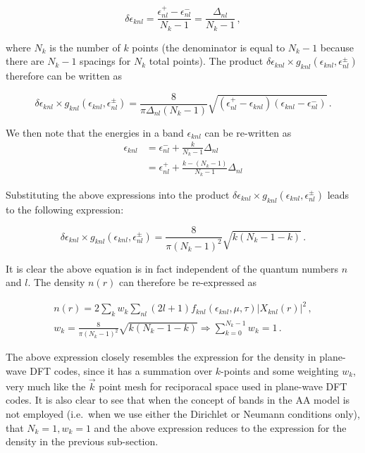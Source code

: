 \documentclass[preprint,aps]{revtex4-2}
\begin{document}
\begin{equation}
\delta\epsilon_{knl} = \frac{\epsilon^+_{nl} - \epsilon^-_{nl}}{N_k-1} = \frac{\Delta_{nl}}{N_k-1}\,,
\end{equation}

where \(N_k\) is the number of \(k\) points (the denominator is equal to
\(N_k-1\) because there are \(N_k-1\) spacings for \(N_k\) total
points). The product
\(\delta\epsilon_{knl} \times g_{knl}(\epsilon_{knl},\epsilon_{nl}^\pm)\)
therefore can be written as

\begin{equation}
\delta\epsilon_{knl} \times g_{knl}(\epsilon_{knl},\epsilon_{nl}^\pm) = \frac{8}{\pi\Delta_{nl}(N_k-1)} \sqrt{(\epsilon^+_{nl}-\epsilon_{knl})(\epsilon_{knl} - \epsilon^-_{nl})}\,.
\end{equation}

We then note that the energies in a band \(\epsilon_{knl}\) can be
re-written as \begin{align}
\epsilon_{knl} &= \epsilon_{nl}^- + \frac{k}{N_k-1}\Delta_{nl} \\
               &= \epsilon_{nl}^+ + \frac{k-(N_k-1)}{N_k-1}\Delta_{nl}
\end{align}

Substituting the above expressions into the product
\(\delta\epsilon_{knl} \times g_{knl}(\epsilon_{knl},\epsilon_{nl}^\pm)\)
leads to the following expression:

\begin{equation}
\delta\epsilon_{knl} \times g_{knl}(\epsilon_{knl},\epsilon_{nl}^\pm) = \frac{8}{\pi(N_k-1)^2}\sqrt{k(N_k-1-k)}\,.
\end{equation}

It is clear the above equation is in fact independent of the quantum
numbers \(n\) and \(l\). The density \(n(r)\) can therefore be
re-expressed as

\begin{gather}
n(r) = 2\sum_{k} w_k \sum_{nl}(2l+1) f_{knl}(\epsilon_{knl},\mu,\tau) |X_{knl}(r)|^2\,,\\
w_k = \frac{8}{\pi(N_k-1)^2}\sqrt{k(N_k-1-k)} \Rightarrow \sum_{k=0}^{N_k-1} w_k =1\,.
\end{gather}

The above expression closely resembles the expression for the density in
plane-wave DFT codes, since it has a summation over \(k\)-points and
some weighting \(w_k\), very much like the \(\vec{k}\) point mesh for
reciporacal space used in plane-wave DFT codes. It is also clear to see
that when the concept of bands in the AA model is not employed
(i.e.~when we use either the Dirichlet or Neumann conditions only), that
\(N_k=1,w_k=1\) and the above expression reduces to the expression for
the density in the previous sub-section.
\end{document}
